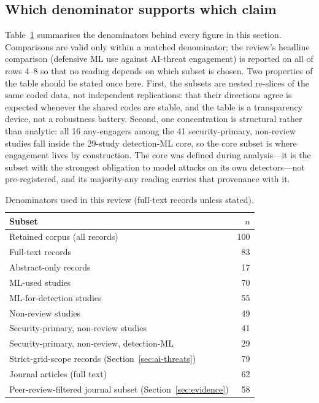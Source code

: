 \documentclass[preprint,12pt]{elsarticle}
\renewcommand{\_}{\plainunderscore\allowbreak}
\begin{document}
\subsection{Which denominator supports which claim}\label{sec:denominators}
Table~\ref{tab:denom} summarises the denominators behind every figure in this section.
Comparisons are valid only within a matched denominator; the review's headline comparison
(defensive ML use against AI-threat engagement) is reported on all of rows 4--8 so that no
reading depends on which subset is chosen. Two properties of the table should be stated
once here. First, the subsets are nested re-slices of the same coded data, not
independent replications: that their directions agree is expected whenever the shared
codes are stable, and the table is a transparency device, not a robustness battery.
Second, one concentration is structural rather than analytic: all 16 any-engagers among
the 41 security-primary, non-review studies fall inside the 29-study detection-ML core,
so the core subset is where engagement lives by construction. The core was defined
during analysis---it is the subset with the strongest obligation to model attacks on its
own detectors---not pre-registered, and its majority-any reading carries that
provenance with it.
\begin{table}[t]
\centering
\caption{Denominators used in this review (full-text records unless stated).}
\label{tab:denom}
\small
\begin{tabular}{@{}lr@{}}
\toprule
Subset & $n$ \\
\midrule
Retained corpus (all records) & 100 \\
Full-text records & 83 \\
Abstract-only records & 17 \\
ML-used studies & 70 \\
ML-for-detection studies & 55 \\
Non-review studies & 49 \\
Security-primary, non-review studies & 41 \\
Security-primary, non-review, detection-ML & 29 \\
Strict-grid-scope records (Section~\ref{sec:ai-threats}) & 79 \\
Journal articles (full text) & 62 \\
Peer-review-filtered journal subset (Section~\ref{sec:evidence}) & 58 \\
\bottomrule
\end{tabular}
\end{table}
\end{document}
